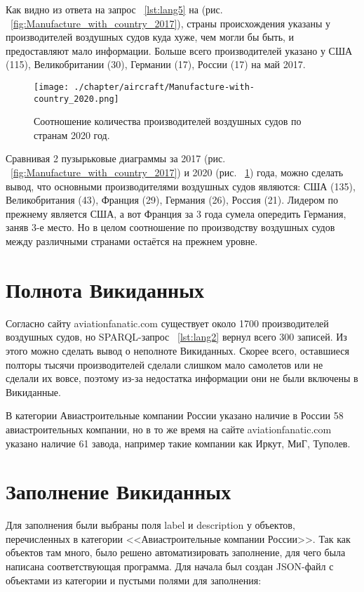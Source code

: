 Как видно из ответа на запрос ~\ref{lst:lang5} на (рис. ~\ref{fig:Manufacture_with_country_2017}), страны происхождения указаны у производителей воздушных судов куда хуже, чем могли бы быть, и предоставляют мало информации. Больше всего производителей указано у США (115), Великобритании (30), Германии (17), России (17) на май 2017.

\begin{figure}[h!]
\centering
	\texttt{[image: ./chapter/aircraft/Manufacture-with-country\_2020.png]}
	\caption{Соотношение количества производителей воздушных судов по странам 2020 год.}
	\label{fig:Manufacture_with_country_2020}
\end{figure}

Сравнивая 2 пузырьковые диаграммы за 2017 (рис. ~\ref{fig:Manufacture_with_country_2017}) и 2020 (рис. ~\ref{fig:Manufacture_with_country_2020}) года, можно сделать вывод, что основными производителями воздушных судов являются: США (135), Великобритания (43), Франция (29), Германия (26), Россия (21). Лидером по прежнему является США, а вот Франция за 3 года сумела опередить Германия, заняв 3-е место. Но в целом соотношение по производству воздушных судов между различными странами остаётся на прежнем уровне.

\section{Полнота Викиданных}

Согласно сайту aviationfanatic.com существует около \num{1700} производителей воздушных судов, но SPARQL-запрос ~\ref{lst:lang2} вернул всего 300 записей. Из этого можно сделать вывод о неполноте Викиданных. Скорее всего, оставшиеся полторы тысячи производителей сделали слишком мало самолетов или не сделали их вовсе, поэтому из-за недостатка информации они не были включены в Викиданные.

В категории Авиастроительные компании России указано наличие в России 58 авиастроительных компании, но в то же время на сайте aviationfanatic.com указано наличие 61 завода, например такие компании как Иркут, МиГ, Туполев.

\section{Заполнение Викиданных}

Для заполнения были выбраны поля label и description у объектов, перечисленных в категории <<Авиастроительные компании России>>. Так как объектов там много, было решено автоматизировать заполнение, для чего была написана соответствующая программа. Для начала был создан JSON-файл с объектами из категории и пустыми полями для заполнения:

